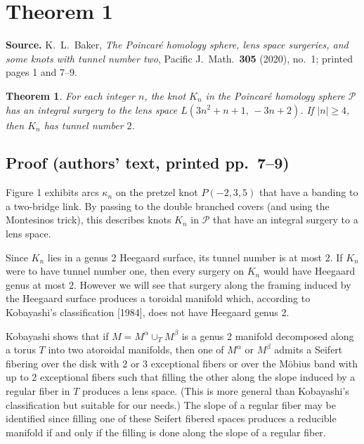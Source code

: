 \documentclass[11pt]{article}
\newtheorem{theorem}{Theorem}
\begin{document}
\section*{Theorem 1}

\textbf{Source.} K.~L.~Baker, \emph{The Poincar\'e homology sphere, lens space surgeries, and some
knots with tunnel number two}, Pacific J.\ Math.\ \textbf{305} (2020), no.~1; printed pages 1 and
7--9.

\begin{theorem}
For each integer $n$, the knot $K_n$ in the Poincar\'e homology sphere $\mathcal{P}$ has an integral
surgery to the lens space $L(3n^2+n+1,\,-3n+2)$. If $|n|\ge 4$, then $K_n$ has tunnel number $2$.
\end{theorem}

\subsection*{Proof (authors' text, printed pp.~7--9)}

Figure 1 exhibits arcs $\kappa_n$ on the pretzel knot $P(-2,3,5)$ that have a banding to a two-bridge
link. By passing to the double branched covers (and using the Montesinos trick), this describes knots
$K_n$ in $\mathcal{P}$ that have an integral surgery to a lens space.

Since $K_n$ lies in a genus 2 Heegaard surface, its tunnel number is at most $2$. If $K_n$ were to
have tunnel number one, then every surgery on $K_n$ would have Heegaard genus at most $2$. However we
will see that surgery along the framing induced by the Heegaard surface produces a toroidal manifold
which, according to Kobayashi's classification [1984], does not have Heegaard genus 2.

Kobayashi shows that if $M=M^\alpha\cup_T M^\beta$ is a genus 2 manifold decomposed along a torus $T$
into two atoroidal manifolds, then one of $M^\alpha$ or $M^\beta$ admits a Seifert fibering over the
disk with 2 or 3 exceptional fibers or over the M\"obius band with up to 2 exceptional fibers such
that filling the other along the slope induced by a regular fiber in $T$ produces a lens space. (This
is more general than Kobayashi's classification but suitable for our needs.) The slope of a regular
fiber may be identified since filling one of these Seifert fibered spaces produces a reducible
manifold if and only if the filling is done along the slope of a regular fiber.
\end{document}
